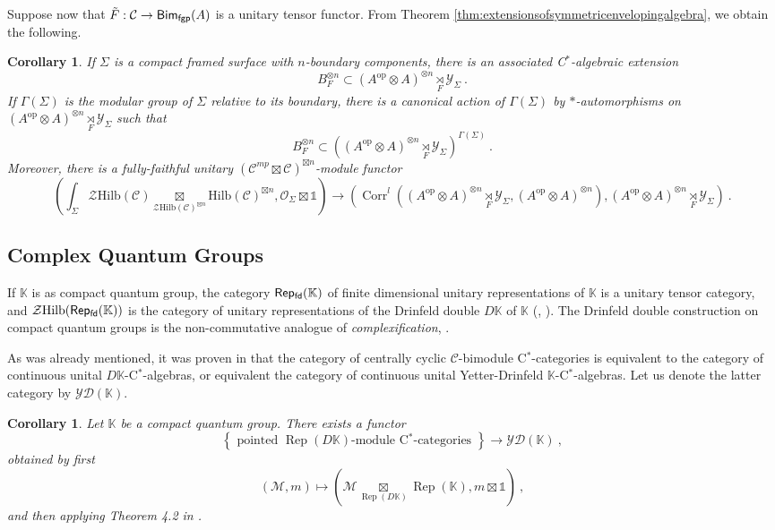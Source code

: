 \documentclass[a4paper,11pt,reqno]{amsart}
\numberwithin{equation}{section}
\newtheorem{corollary}[theorem]{Corollary}
\theoremstyle{remark}
\theoremstyle{definition}
\newcommand{\bK}{\mathbb K}
\newcommand{\cC}{\mathcal C}
\newcommand{\cM}{\mathcal M}
\newcommand{\cO}{\mathcal O}
\newcommand{\cY}{\mathcal Y}
\newcommand{\cZ}{\mathcal Z}
\newcommand{\fgpBim}{{\sf Bim_{fgp}}}
\newcommand{\fdRep}{{\sf Rep_{fd}}}
\DeclareMathOperator{\Rep}{Rep}
\DeclareMathOperator{\Corr}{Corr}
\newcommand\op{\text{op}}
\newcommand\un{{\mathds 1}}
\newcommand{\Hilb}{\mathrm{Hilb}}
\newcommand{\YD}{\mathcal{YD}}
\begin{document}
Suppose now that $\tilde{F}: \cC \to \fgpBim(A)$ is a unitary tensor functor. From Theorem \ref{thm:extensionsofsymmetricenvelopingalgebra}, we obtain the following.
\begin{corollary}
	If $\Sigma$ is a compact framed surface with $n$-boundary components, there is an associated C$^*$-algebraic extension
	\[
	B_F^{\otimes n} \subset (A^{\op} \otimes A)^{\otimes n} \underset{F}{\rtimes} \cY_\Sigma \ .
	\]
	If $\Gamma(\Sigma)$ is the modular group of $\Sigma$ relative to its boundary, there is a canonical action of $\Gamma(\Sigma)$ by $*$-automorphisms on $(A^{\op} \otimes A)^{\otimes n} \underset{F}{\rtimes} \cY_\Sigma$ such that
	\[
	B_F^{\otimes n} \subset \left( (A^{\op} \otimes A)^{\otimes n} \underset{F}{\rtimes} \cY_\Sigma \right)^{\Gamma(\Sigma)} \ . 
	\]
	Moreover, there is a fully-faithful unitary $(\cC^{mp} \boxtimes \cC)^{\boxtimes n}$-module functor
	\[
		\left(  \int_{\Sigma} \cZ \Hilb(\cC) \underset{\cZ \Hilb(\cC)^{\boxtimes n}}{\boxtimes} \Hilb(\cC)^{\boxtimes n}, \cO_\Sigma \boxtimes \un  \right) \to \left( \Corr^l((A^{\op} \otimes A)^{\otimes n} \underset{F}{\rtimes} \cY_\Sigma, (A^{\op} \otimes A)^{\otimes n}) , (A^{\op} \otimes A)^{\otimes n} \underset{F}{\rtimes} \cY_\Sigma \right) \ .
	\]
	\label{cor:extensionofSEfromFH}
\end{corollary}

\subsection{Complex Quantum Groups}

If $\bK$ is as compact quantum group, the category $\fdRep(\bK)$ of finite dimensional unitary representations of $\bK$ is a unitary tensor category, and $\cZ \Hilb(\fdRep(\bK))$ is the category of unitary representations of the Drinfeld double $D \bK$ of $\bK$ (\cite{MR3204665}, \cite{MR3509018}). The Drinfeld double construction on compact quantum groups is the non-commutative analogue of {\em complexification}, \cite{MR4162277}.

As was already mentioned, it was proven in \cite{hataishi2025categorical} that the category of centrally cyclic $\cC$-bimodule C$^*$-categories is equivalent to the category of continuous unital $D \bK$-C$^*$-algebras, or equivalent the category of continuous unital Yetter-Drinfeld $\bK$-C$^*$-algebras. Let us denote the latter category by $\YD(\bK)$.



\begin{corollary}
	Let $\bK$ be a compact quantum group. There exists a functor
	\[
	\left\lbrace \text{ pointed $\Rep(D\bK)$-module C$^*$-categories } \right\rbrace  \to \YD(\bK) \ ,
	\]
	obtained by first
	\[
	(\cM,m) \mapsto (\cM \underset{\Rep(D\bK)}{\boxtimes} \Rep(\bK) , m \boxtimes \un) \ ,
	\]
	and then applying Theorem 4.2 in \cite{hataishi2025categorical}.
	\label{cor:fromRepDKmodulestoYetterDrinfeldlagebras}
\end{corollary}
\end{document}

